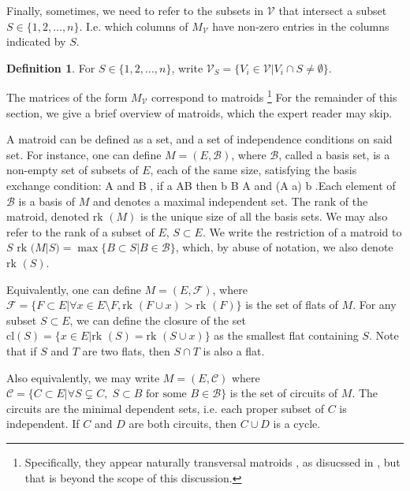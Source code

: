 \documentclass[11pt]{article}
\newcommand{\rk}{\textrm{rk }}
\def\bas #1\eas{\begin{align*} #1 \end{align*}}
\newcommand{\cV}{\mathcal{V}}
\newcommand{\cB}{\mathcal{B}}
\theoremstyle{remark}
\theoremstyle{definition}
\newtheorem{dfn}[thm]{Definition}
\begin{document}
Finally, sometimes, we need to refer to the subsets in $\cV$ that intersect a subset  $S \in \{1,2,\dots,n\}$. I.e. which columns of $M_{\cV}$ have non-zero entries in the columns indicated by $S$. 

\begin{dfn}\label{dfn:columns}
For $S \in \{1,2,\dots,n\}$, write $\cV_S =\{V_i \in \cV |  V_i \cap S \neq \emptyset\}$. 
\end{dfn}

The matrices of the form $M_\cV$ correspond to matroids \footnote{Specifically, they appear naturally transversal matroids \cite{????}, as disucssed in \cite{basisshapeloci}, but that is beyond the scope of this discussion.} For the remainder of this section, we give a brief overview of matroids, which the expert reader may skip. 

A matroid can be defined as a set, and a set of independence conditions on said set. For instance, one can define $M = (E, \mathcal{B})$, where $\mathcal{B}$, called a basis set, is a non-empty set of subsets of $E$, each of the same size, satisfying the basis exchange condition: \bas \textrm{for  all } A \textrm{ and } B \in \cB, \textrm{ if }  a \in A\setminus B \textrm{ then } \exists b \in B \setminus A \textrm{ and } (A \setminus a) \cup b \in  \cB \;.\eas Each element of $$ is a basis of $M$ and denotes a maximal independent set. The rank of the matroid, denoted $\rk(M)$ is the unique size of all the basis sets. We may also refer to the rank of a subset of $E$, $S \subset E$. We write the restriction of a matroid to $S$ $\rk(M|S) = \max \{B \subset S| B \in \mathcal{B} \}$, which, by abuse of notation, we also denote $\rk(S)$. 

Equivalently, one can define $M = (E, \mathcal{F})$, where $\mathcal{F} = \{ F \subset E| \forall x \in E \setminus F, \rk(F \cup x) > \rk(F)\}$ is the set of flats of $M$. For any subset $S \subset E$, we can define the closure of the set $\textrm{cl}(S)  = \{x \in E | \rk(S) = \rk(S \cup x)\}$ as the smallest flat containing $S$. Note that if $S$ and $T$ are two flats, then $S \cap T$ is also a flat. 

Also equivalently, we may write $M = (E, \mathcal{C})$ where $\mathcal{C} = \{C \subset E | \forall S \subsetneq C, \; S \subset B \textrm{ for some } B \in \mathcal{B}\}$ is the set of circuits of $M$. The circuits are the minimal dependent sets, i.e. each proper subset of $C$ is independent. If $C$ and $D$ are both circuits, then $C \cup D$ is a cycle. 
\end{document}
